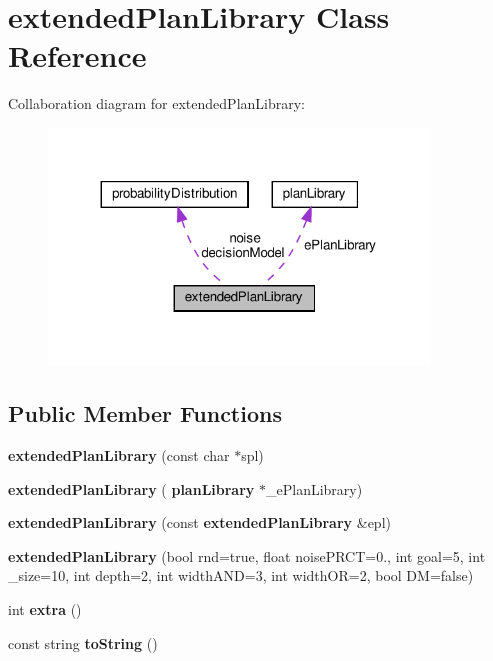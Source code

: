 \section{extended\+Plan\+Library Class Reference}
\label{classextended_plan_library}


Collaboration diagram for extended\+Plan\+Library\+:
\nopagebreak
\begin{figure}[H]
\begin{center}
\leavevmode
\includegraphics[width=287pt]{classextended_plan_library__coll__graph}
\end{center}
\end{figure}
\subsection*{Public Member Functions}
\begin{DoxyCompactItemize}
\item 
\mbox{\label{classextended_plan_library_ab11fbde77535d6bc627ec3df451c3f11}} 
{\bfseries extended\+Plan\+Library} (const char $\ast$spl)
\item 
\mbox{\label{classextended_plan_library_a0d19981e96203b01bf6707bef31b9f34}} 
{\bfseries extended\+Plan\+Library} (\textbf{ plan\+Library} $\ast$\+\_\+e\+Plan\+Library)
\item 
\mbox{\label{classextended_plan_library_a70a6870f3d6a25c5d42668f384c9493d}} 
{\bfseries extended\+Plan\+Library} (const \textbf{ extended\+Plan\+Library} \&epl)
\item 
\mbox{\label{classextended_plan_library_a0d31668984ad5bc8e7c0993cf0c45651}} 
{\bfseries extended\+Plan\+Library} (bool rnd=true, float noise\+P\+R\+CT=0., int goal=5, int \+\_\+size=10, int depth=2, int width\+A\+ND=3, int width\+OR=2, bool DM=false)
\item 
\mbox{\label{classextended_plan_library_a804ea71b83f1c288d6beab0caad7fec3}} 
int {\bfseries extra} ()
\item 
\mbox{\label{classextended_plan_library_ab28011e80bd6b2bdbd5dbeb0ad0852c4}} 
const string {\bfseries to\+String} ()
\end{DoxyCompactItemize}
